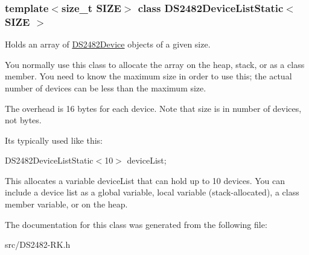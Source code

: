\subsubsection*{template$<$size\+\_\+t S\+I\+ZE$>$\newline
class D\+S2482\+Device\+List\+Static$<$ S\+I\+Z\+E $>$}

Holds an array of \mbox{\hyperlink{class_d_s2482_device}{D\+S2482\+Device}} objects of a given size. 

You normally use this class to allocate the array on the heap, stack, or as a class member. You need to know the maximum size in order to use this; the actual number of devices can be less than the maximum size.

The overhead is 16 bytes for each device. Note that size is in number of devices, not bytes.

It\textquotesingle{}s typically used like this\+:

D\+S2482\+Device\+List\+Static$<$10$>$ device\+List;

This allocates a variable device\+List that can hold up to 10 devices. You can include a device list as a global variable, local variable (stack-\/allocated), a class member variable, or on the heap. 

The documentation for this class was generated from the following file\+:\begin{DoxyCompactItemize}
\item 
src/D\+S2482-\/\+R\+K.\+h\end{DoxyCompactItemize}
